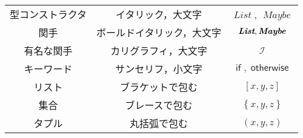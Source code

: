 \documentclass[a4paper,draft]{jsbook}
\newcommand{\mFunctor}[1]{\textit{\textbf{#1}}}
\newcommand{\mSpecialFunctor}[1]{\mathcal{#1}} %
\newcommand{\mTypeConstructor}[1]{\mathit{#1}} %
\newcommand{\mKeyword}[1]{\mathsf{#1}}
\newcommand{\mIfKeyword}{\mKeyword{if}}
\newcommand{\mOtherwiseKeyword}{\mKeyword{otherwise}}
\newcommand{\mListWith}[1]{\left[#1\right]}
\newcommand{\mSetWith}[1]{\left\{#1\right\}}
\newcommand{\mTupleWith}[1]{\left(#1\right)}
\DeclareMathOperator{\mListTypeConstructor}{\mTypeConstructor{List}}
\DeclareMathOperator{\mMaybeTypeConstructor}{\mTypeConstructor{Maybe}}
\DeclareMathOperator{\mIFunctor}{\mSpecialFunctor{I}}
\DeclareMathOperator{\mIf}{\mIfKeyword}
\DeclareMathOperator{\mOtherwise}{\mOtherwiseKeyword}
\newcommand{\mathVarKeyword}[1]{\operatorname{\mathrm{#1}}}
\newcommand{\mathRest}{\mathVarKeyword{rest}}
\begin{document}
\begin{table*}
\begin{center}
\begin{tabular}{||c|c|c||}
型コンストラクタ&イタリック，大文字&$\mListTypeConstructor$, $\mMaybeTypeConstructor$\\
関手&ボールドイタリック，大文字&$\mFunctor{List},\mFunctor{Maybe}$\\
有名な関手&カリグラフィ，大文字&$\mIFunctor$\\
\hline
キーワード&サンセリフ，小文字&$\mIf,\mOtherwise$\\
\hline
リスト&ブラケットで包む&$\mListWith{x,y,z}$\\
集合&ブレースで包む&$\mSetWith{x,y,z}$\\
タプル&丸括弧で包む&$\mTupleWith{x,y,z}$\\
\hline
\end{tabular}
\end{center}
\end{table*}
\end{document}
